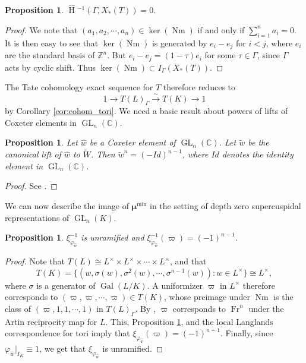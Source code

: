 \documentclass[11pt]{amsart}
\theoremstyle{plain}
\newtheorem{proposition}[theorem]{Proposition}
\newcommand{\HT}[1]{\hat{\HH}{}^{#1}}
\theoremstyle{definition}
\DeclareMathOperator{\Gal}{Gal}
\DeclareMathOperator{\HH}{H}
\DeclareMathOperator{\Nm}{Nm}
\DeclareMathOperator{\Fr}{Fr}
\DeclareMathOperator{\GL}{GL}
\newcommand{\CC}{\mathbb{C}}
\newcommand{\Lx}{L^\times}
\newcommand{\bmu}{\boldsymbol\mu}
\newcommand{\mumin}{\bmu^{\min}}
\begin{document}
\begin{proposition}
$\HT{-1}(\Gamma, X_*(T)) = 0$.
\end{proposition}

\begin{proof}
We note that $(a_1, a_2, \cdots, a_n) \in \ker(\Nm)$ if and only if $\sum_{i=1}^n a_i = 0$.
It is then easy to see that $\ker(\Nm)$ is generated by $e_i - e_j$ for $i < j$, where
$e_i$ are the standard basis of $\mathbb{Z}^n$.  But $e_i - e_j = (1 - \tau)e_i$ for some
$\tau \in \Gamma$, since $\Gamma$ acts by cyclic shift.  Thus $\ker(\Nm) \subset I_{\Gamma}(X_*(T))$.
\end{proof}

The Tate cohomology exact sequence for $T$ therefore reduces to
$$1 \rightarrow T(L)_{\Gamma} \xrightarrow{\sim} T(K) \rightarrow 1$$ by
Corollary \ref{cor:cohom_tori}.  We need a basic result about powers of lifts
of Coxeter elements in $\GL_{n}(\CC)$.

\begin{proposition}\label{prop:powers_of_lifts}
Let $\hat{w}$ be a Coxeter element of $\GL_{n}(\CC)$.  Let $\tilde{w}$ be the
canonical lift of $\hat{w}$ to $\widetilde{W}$. Then $\tilde{w}^n = (-Id)^{n-1}$, where $Id$
denotes the identity element in $\GL_{n}(\CC)$.
\end{proposition}

\begin{proof}
See \cite[\S3.1]{zaremsky:ppa}.
\end{proof}

We can now describe the image of $\mumin$ in the setting of
depth zero supercuspidal representations of $\GL_{n}(K)$.

\begin{proposition} \label{prop:rectifier_agreement}
$\xi_{\varphi_{\hat{w}}}^{-1}$ is unramified and
$\xi_{\varphi_{\hat{w}}}^{-1}(\varpi) = (-1)^{n-1}$.
\end{proposition}

\begin{proof}
Note that $T(L) \cong \Lx \times \Lx \times \cdots \times \Lx$, and
that $$T(K) = \{(w, \sigma(w), \sigma^2(w), \cdots, \sigma^{n-1}(w)) : w \in \Lx \} \cong \Lx,$$ where
$\sigma$ is a generator of $\Gal(L/K)$.  A uniformizer $\varpi$ in $\Lx$
therefore corresponds to $(\varpi, \varpi, \cdots, \varpi) \in T(K)$, whose
preimage under $\Nm$ is the class of $(\varpi, 1, 1, \cdots, 1)$ in $T(L)_{\Gamma}$.
By \cite[\S 2.4]{serre:LocalClassFieldThy}, $\varpi$ corresponds to $\Fr^n$ under the Artin
reciprocity map for $L$.  This, Proposition \ref{prop:powers_of_lifts},
and the local Langlands correspondence for tori imply that
$\xi_{\varphi_{\hat{w}}}(\varpi) = (-1)^{n-1}$.
Finally, since $\varphi_{\hat{w}}|_{I_K} \equiv 1$, we get that $\xi_{\varphi_{\hat{w}}}$ is
unramified.
\end{proof}
\end{document}
